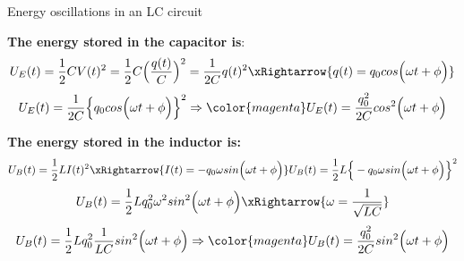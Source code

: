 \begin{frame}{Energy oscillations in an LC circuit}

{\bf The energy stored in the capacitor is}:
\begin{equation*}
  U_E(t)= \frac{1}{2} CV(t)^2 = \frac{1}{2} C \Big( \frac{q(t)}{C} \Big)^2 = \frac{1}{2C} q(t)^2
 \xRightarrow{q(t) = q_0 cos\Big( \omega t + \phi \Big)}
\end{equation*}
\begin{equation*}
  U_E(t) = \frac{1}{2C} \Big\{ q_0 cos\Big( \omega t + \phi \Big) \Big\}^2 \Rightarrow
  {\color{magenta}
      U_E(t) = \frac{q_0^2}{2C} cos^{2}\Big( \omega t + \phi \Big)
 }
\end{equation*}

\vspace{0.2cm}

{\bf The energy stored in the inductor is:}
\begin{equation*}
  U_B(t) = \frac{1}{2} LI(t)^2 \xRightarrow{ I(t) = - q_0 \omega sin\Big( \omega t + \phi \Big)}
  U_B(t) = \frac{1}{2} L \Big\{ - q_0 \omega sin\Big( \omega t + \phi \Big) \Big\}^2
\end{equation*}
\begin{equation*}
   U_B(t) = \frac{1}{2} L q_0^2 \omega^2 sin^2\Big( \omega t + \phi \Big) \xRightarrow{\omega = \frac{1}{\sqrt{LC}}}
\end{equation*}
\begin{equation*}
   U_B(t) = \frac{1}{2} L q_0^2 \frac{1}{LC} sin^2\Big( \omega t + \phi \Big)
  \Rightarrow
  {\color{magenta}
      U_B(t) = \frac{q_0^2}{2C} sin^2\Big( \omega t + \phi \Big)
  }
\end{equation*}

\end{frame}

%
%
%


